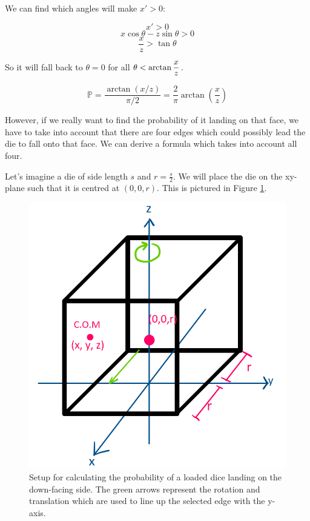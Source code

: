 \documentclass[english,12pt,a4paper,final]{article}
\begin{document}
We can find which angles will make $x' > 0$:

\begin{equation*}
	x' > 0
\end{equation*}
\begin{equation*}
	x\cos\theta - z\sin\theta > 0
\end{equation*}
\begin{equation*}
	\frac{x}{z} > \tan\theta
\end{equation*}

So it will fall back to $\theta=0$ for all $\theta < \arctan\mathlarger{\frac{x}{z}}$.

\begin{equation}\label{dieEdgeProb}
	\mathbb{P} = \frac{\arctan(x/z)}{\pi/2} = \frac{2}{\pi} \arctan\left(\frac{x}{z}\right)
\end{equation}

However, if we really want to find the probability of it landing on that face, we have to take into account that there are four edges which could possibly lead the die to fall onto that face. We can derive a formula which takes into account all four.

Let's imagine a die of side length $s$ and $r=\frac{s}{2}$. We will place the die on the xy-plane such that it is centred at $(0, 0, r)$. This is pictured in Figure \ref{fig:loadeddie3d}.

\begin{figure}[H]
	\centering
	\includegraphics[width=0.7\linewidth]{loadedDie3d}
	\caption{Setup for calculating the probability of a loaded dice landing on the down-facing side. The green arrows represent the rotation and translation which are used to line up the selected edge with the y-axis.}
	\label{fig:loadeddie3d}
\end{figure}
\end{document}
